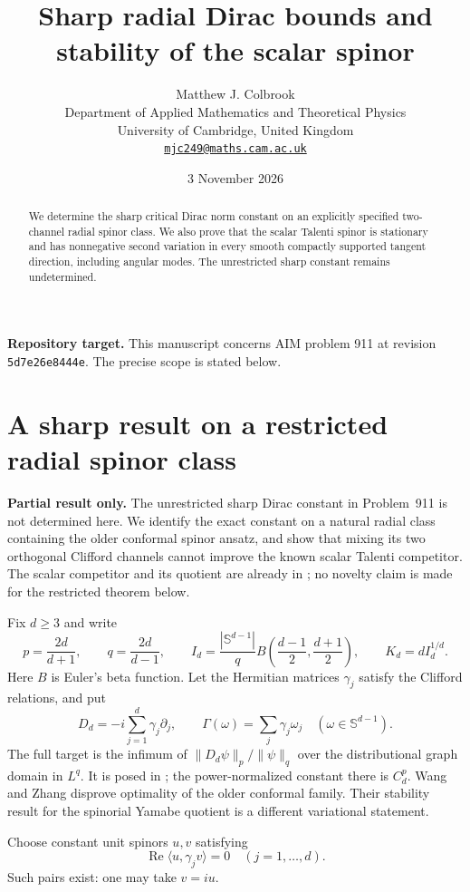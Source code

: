 \documentclass[11pt,a4paper]{article}
\title{\textbf{Sharp radial Dirac bounds and stability of the scalar spinor}}
\author{Matthew J. Colbrook\\[3pt]
{\small Department of Applied Mathematics and Theoretical Physics}\\
{\small University of Cambridge, United Kingdom}\\
{\small\href{mailto:mjc249@maths.cam.ac.uk}{\texttt{mjc249@maths.cam.ac.uk}}}}
\date{3 November 2026}
\theoremstyle{remark}
\begin{document}
\maketitle
\begin{abstract}
We determine the sharp critical Dirac norm constant on an explicitly specified two-channel radial spinor class. We also prove that the scalar Talenti spinor is stationary and has nonnegative second variation in every smooth compactly supported tangent direction, including angular modes. The unrestricted sharp constant remains undetermined.
\end{abstract}
\noindent\textbf{Repository target.}
This manuscript concerns AIM problem 911 at revision
\texttt{5d7e26e8444e}. The precise scope is stated below.
\medskip

\section{A sharp result on a restricted radial spinor class}
\label{sec:911partial}

\textbf{Partial result only.} The unrestricted sharp Dirac constant in
Problem~911 is not determined here. We identify the exact constant on a
natural radial class containing the older conformal spinor ansatz, and
show that mixing its two orthogonal Clifford channels cannot improve the
known scalar Talenti competitor. The scalar competitor and its quotient
are already in \cite[Theorem~4.1]{BM2026}; no novelty claim is made for the
restricted theorem below.

Fix $d\ge3$ and write
\[
 p=\frac{2d}{d+1},\qquad q=\frac{2d}{d-1},\qquad
 I_d=\frac{|\mathbb S^{d-1}|}{q}
 B\!\left(\frac{d-1}{2},\frac{d+1}{2}\right),
 \qquad K_d=dI_d^{1/d}.
\]
Here $B$ is Euler's beta function. Let the Hermitian matrices $\gamma_j$
satisfy the Clifford relations, and put
\[
 D_d=-i\sum_{j=1}^d\gamma_j\partial_j,
 \qquad \Gamma(\omega)=\sum_j\gamma_j\omega_j
 \quad(\omega\in\mathbb S^{d-1}).
\]
The full target is the infimum of $\|D_d\psi\|_p/\|\psi\|_q$ over
the distributional graph domain in $L^q$.
It is posed in \cite[equation (8)]{FrankLoss2022};
the power-normalized constant there is $C_d^p$.
Wang and Zhang \cite[Introduction and Theorem 1.5]{WangZhang2025}
disprove optimality of the older conformal family. Their stability
result for the spinorial Yamabe quotient is a different variational statement.

Choose constant unit spinors $u,v$ satisfying
\begin{equation}\label{eq:911-orthogonality}
 \operatorname{Re}\langle u,\gamma_jv\rangle=0
 \quad(j=1,\ldots,d).
\end{equation}
Such pairs exist: one may take $v=iu$.
\end{document}
